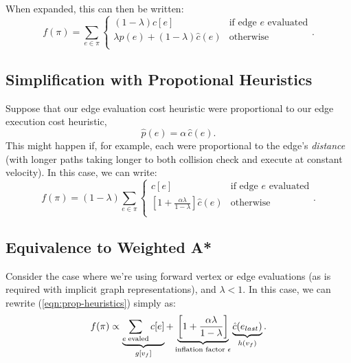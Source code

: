 \documentclass{report}
\begin{document}
When expanded,
this can then be written:
\begin{equation}
   f(\pi) = \sum_{e \in \pi} \left\{
   \begin{array}{cl}
      (1 - \lambda) c[e] & \mbox{if edge } e \mbox{ evaluated}  \\
      \lambda \hat{p}(e) + (1 - \lambda) \hat{c}(e) & \mbox{otherwise} \\
   \end{array}
   \right.
   .
   \label{eqn:general-objective-explicit}
\end{equation}

\subsection{Simplification with Propotional Heuristics}

Suppose that our edge evaluation cost heuristic
were proportional to our edge execution cost heuristic,
\begin{equation}
   \hat{p}(e) = \alpha \, \hat{c}(e) .
\end{equation}
This might happen if, for example, each were proportional to the edge's
\emph{distance} (with longer paths taking longer to both collision check
and execute at constant velocity).
In this case, we can write:
\begin{equation}
   f(\pi) = (1-\lambda) \sum_{e \in \pi} \left\{
   \begin{array}{cl}
      c[e] & \mbox{if edge } e \mbox{ evaluated}  \\
      \left[ 1 + \frac{\alpha\lambda}{1 - \lambda} \right] \hat{c}(e) & \mbox{otherwise} \\
   \end{array}
   \right.
   .
   \label{eqn:prop-heuristics}
\end{equation}

\subsection{Equivalence to Weighted A*}

Consider the case where we're using forward vertex or edge evaluations
(as is required with implicit graph representations),
and $\lambda < 1$.
In this case, we can rewrite (\ref{eqn:prop-heuristics})
simply as:
\begin{equation}
   f(\pi) \propto
   \underbrace{\sum_{e \; \mbox{\scriptsize evaled}} c[e]}_{g[v_f]}
   +
   \underbrace{\left[ 1 + \frac{\alpha \lambda}{1-\lambda} \right]}_{
      \mbox{\scriptsize inflation factor } \epsilon}
   \underbrace{\hat{c}(e_{last})}_{h(v_f)}
   .
\end{equation}
\end{document}
